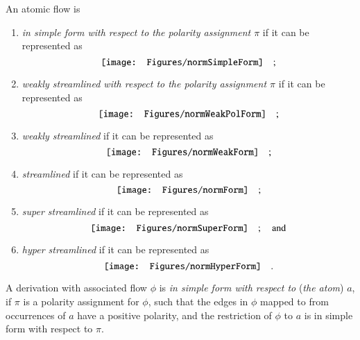 \begin{definition}\label{definition:FlowNormalForms}
An atomic flow is
\begin{enumerate}
\item\label{definition:FlowNormalForms:item:SimpleForm}
\emph{in simple form with respect to the polarity assignment $\pi$} if it can be represented as
\[
\vcenter{\hbox{\texttt{[image: Figures/normSimpleForm]}}}
\quad;
\]
\item\label{definition:FlowNormalForms:item:WeaklyStreamlinedPolarity}
\emph{weakly streamlined with respect to the polarity assignment $\pi$} if it can be represented as
\[
\vcenter{\hbox{\texttt{[image: Figures/normWeakPolForm]}}}
\quad;
\]
\item\label{definition:FlowNormalForms:item:WeaklyStreamlined}
\emph{weakly streamlined} if it can be represented as
\[
\vcenter{\hbox{\texttt{[image: Figures/normWeakForm]}}}
\quad;
\]
\item\label{definition:FlowNormalForms:item:Streamlined}
\emph{streamlined} if it can be represented as
\[
\vcenter{\hbox{\texttt{[image: Figures/normForm]}}}
\quad;
\]
\item\label{definition:FlowNormalForms:item:SuperStreamlined}
\emph{super streamlined} if it can be represented as
\[
\vcenter{\hbox{\texttt{[image: Figures/normSuperForm]}}}
\quad;\quad\mbox{and}
\]
\item\label{definition:FlowNormalForms:item:HyperStreamlined}
\emph{hyper streamlined} if it can be represented as
\[
\vcenter{\hbox{\texttt{[image: Figures/normHyperForm]}}}
\quad.
\]
\end{enumerate}
\end{definition}

\begin{definition}\label{definition:DerSimpleForm}
A derivation with associated flow $\phi$ is \emph{in simple form with respect to} (\emph{the atom}) $a$, if $\pi$ is a polarity assignment for $\phi$, such that the edges in $\phi$ mapped to from occurrences of $a$ have a positive polarity, and the restriction of $\phi$ to $a$ is in simple form with respect to $\pi$.
\end{definition}

